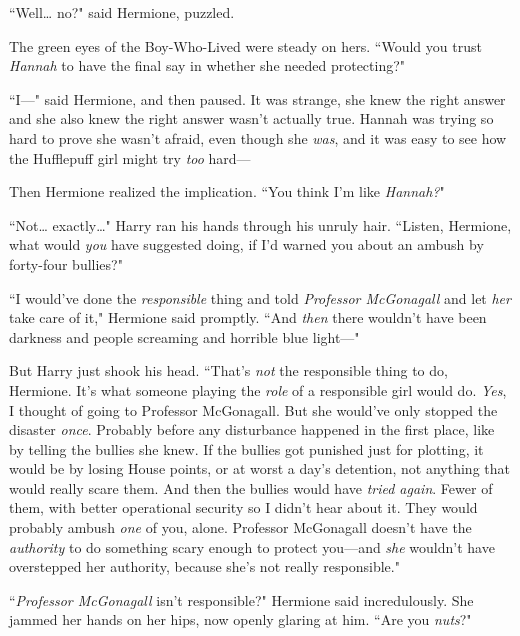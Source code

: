 ``Well{\ldots} no?" said Hermione, puzzled.

The green eyes of the Boy-Who-Lived were steady on hers. ``Would you trust \emph{Hannah} to have the final say in whether she needed protecting?"

``I—" said Hermione, and then paused. It was strange, she knew the right answer and she also knew the right answer wasn't actually true. Hannah was trying so hard to prove she wasn't afraid, even though she \emph{was}, and it was easy to see how the Hufflepuff girl might try \emph{too} hard—

Then Hermione realized the implication. ``You think I'm like \emph{Hannah?}"

``Not{\ldots} exactly{\ldots}" Harry ran his hands through his unruly hair. ``Listen, Hermione, what would \emph{you} have suggested doing, if I'd warned you about an ambush by forty-four bullies?"

``I would've done the \emph{responsible} thing and told \emph{Professor McGonagall} and let \emph{her} take care of it," Hermione said promptly. ``And \emph{then} there wouldn't have been darkness and people screaming and horrible blue light—"

But Harry just shook his head. ``That's \emph{not} the responsible thing to do, Hermione. It's what someone playing the \emph{role} of a responsible girl would do. \emph{Yes}, I thought of going to Professor McGonagall. But she would've only stopped the disaster \emph{once}. Probably before any disturbance happened in the first place, like by telling the bullies she knew. If the bullies got punished just for plotting, it would be by losing House points, or at worst a day's detention, not anything that would really scare them. And then the bullies would have \emph{tried again}. Fewer of them, with better operational security so I didn't hear about it. They would probably ambush \emph{one} of you, alone. Professor McGonagall doesn't have the \emph{authority} to do something scary enough to protect you—and \emph{she} wouldn't have overstepped her authority, because she's not really responsible."

``\emph{Professor McGonagall} isn't responsible?" Hermione said incredulously. She jammed her hands on her hips, now openly glaring at him. ``Are you \emph{nuts}?"

